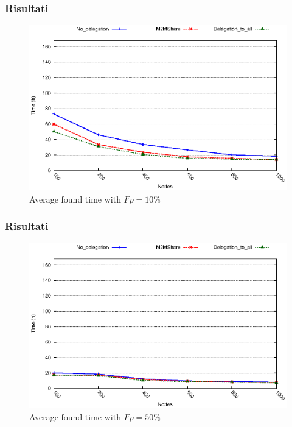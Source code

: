 \documentclass{beamer}
\begin{document}
\begin{frame}
\frametitle{Risultati}
\begin{center}
\begin{figure}[ht]
\includegraphics[scale=0.7]{../grafici/tempiVF_Fp10.eps}
\caption{Average found time with $Fp = 10\%$}
\end{figure}
\end{center}
\end{frame}

\begin{frame}
\frametitle{Risultati}
\begin{center}
\begin{figure}[ht]
\includegraphics[scale=0.7]{../grafici/tempiVF_Fp50.eps}
\caption{Average found time with $Fp = 50\%$}
\end{figure}
\end{center}
\end{frame}
\end{document}
